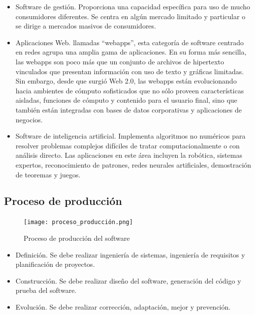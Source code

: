\documentclass{article}
\begin{document}
\begin{itemize}
\item Software de gestión. Proporciona una capacidad específica para uso de mucho consumidores diferentes. Se centra en algún mercado limitado y particular o se dirige a mercados masivos de consumidores.

\item Aplicaciones Web. llamadas ``webapps'', esta categoría de software centrado en redes agrupa una amplia gama de aplicaciones. En su forma más sencilla, las webapps son poco más que un conjunto de archivos de hipertexto vinculados que presentan información con uso de texto y gráficas limitadas. Sin embargo, desde que surgió Web 2.0, las webapps están evolucionando hacia ambientes de cómputo sofisticados que no sólo proveen características aisladas, funciones de cómputo y contenido para el usuario final, sino que también están integradas con bases de datos corporativas y aplicaciones de negocios.

\item Software de inteligencia artificial. Implementa algoritmos no numéricos para resolver problemas complejos difíciles de tratar computacionalmente o con análisis directo. Las aplicaciones en este área incluyen la robótica, sistemas expertos, reconocimiento de patrones, redes neurales artificiales, demostración de teoremas y juegos.
\end{itemize}

\subsection{Proceso de producción}

\begin{figure}[h]
\centering
\caption{Proceso de producción del software}
\texttt{[image: proceso\_producción.png]}
\end{figure}

\begin{itemize}
\item Definición. Se debe realizar ingeniería de sistemas, ingeniería de requisitos y planificación de proyectos.

\item Construcción. Se debe realizar diseño del software, generación del código y prueba del software.

\item Evolución. Se debe realizar corrección, adaptación, mejor y prevención.
\end{itemize}
\end{document}
